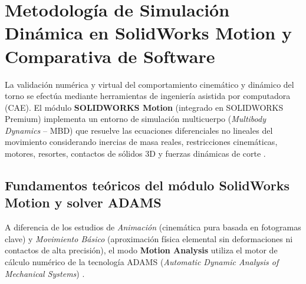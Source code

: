 \documentclass[12pt,a4paper]{article}
\begin{document}
\vspace{4pt}
\noindent{\color{utablue!30}\rule{\textwidth}{0.5pt}}
\vspace{2pt}
\section{Metodología de Simulación Dinámica en SolidWorks Motion y Comparativa de Software}
\label{sec:simulacion_solidworks}

La validación numérica y virtual del comportamiento cinemático y dinámico del torno se efectúa mediante herramientas de ingeniería asistida por computadora (CAE). El módulo \textbf{SOLIDWORKS Motion} (integrado en SOLIDWORKS Premium) implementa un entorno de simulación multicuerpo (\textit{Multibody Dynamics} -- MBD) que resuelve las ecuaciones diferenciales no lineales del movimiento considerando inercias de masa reales, restricciones cinemáticas, motores, resortes, contactos de sólidos 3D y fuerzas dinámicas de corte \cite{dassault2023, shabana2020}.

\subsection{Fundamentos teóricos del módulo SolidWorks Motion y solver ADAMS}
A diferencia de los estudios de \textit{Animación} (cinemática pura basada en fotogramas clave) y \textit{Movimiento Básico} (aproximación física elemental sin deformaciones ni contactos de alta precisión), el modo \textbf{Motion Analysis} utiliza el motor de cálculo numérico de la tecnología ADAMS (\textit{Automatic Dynamic Analysis of Mechanical Systems}) \cite{dassault2023, nikravesh2018, shabana2020}.
\end{document}
